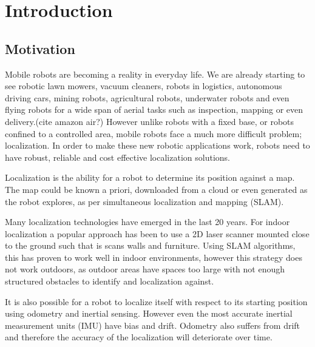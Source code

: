 \chapter{Introduction}
\label{chapter:Introduction}


\section{Motivation}

Mobile robots are becoming a reality in everyday life.  We are already starting to see robotic lawn mowers, vacuum cleaners, robots in logistics, autonomous driving cars, mining robots, agricultural robots, underwater robots and even flying robots for a wide span of aerial tasks such as inspection, mapping or even delivery.(cite amazon air?)  However unlike robots with a fixed base, or robots confined to a controlled area, mobile robots face a much more difficult problem; localization.  In order to make these new robotic applications work, robots need to have robust, reliable and cost effective localization solutions.

Localization is the ability for a robot to determine its position against a map.  The map could be known a priori, downloaded from a cloud or even generated as the robot explores, as per simultaneous localization and mapping (SLAM).  

Many localization technologies have emerged in the last 20 years.  For indoor localization a popular approach has been to use a 2D laser scanner mounted close to the ground such that is scans walls and furniture.  Using SLAM algorithms, this has proven to work well in indoor environments, however this strategy does not work outdoors, as outdoor areas have spaces too large with not enough structured obstacles to identify and localization against.

It is also possible for a robot to localize itself with respect to its starting position using odometry and inertial sensing.  However even the most accurate inertial measurement units (IMU) have bias and drift.  Odometry also suffers from drift and therefore the accuracy of the localization will deteriorate over time.

